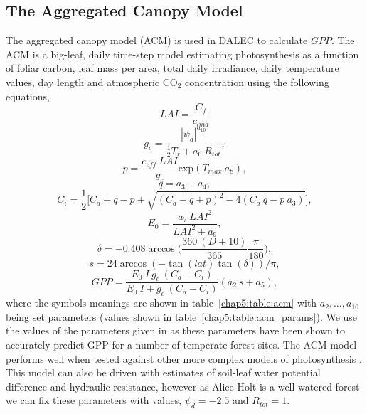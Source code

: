 \subsection{The Aggregated Canopy Model} \label{chap5:sec:ACM}
The aggregated canopy model (ACM) is used in DALEC to calculate $GPP$. The ACM is a big-leaf, daily time-step model estimating photosynthesis as a function of foliar carbon, leaf mass per area, total daily irradiance, daily temperature values, day length and atmospheric CO\(_{2}\) concentration using the following equations,
\begin{equation}
LAI = \frac{C_f}{c_{lma}} 
\end{equation}
\begin{equation} 
g_c = \frac{|\psi_d|^{a_{10}}}{\frac{1}{2}T_r + a_6~R_{tot}},
\end{equation}
\begin{equation}
p = \frac{c_{eff}~LAI}{g_c}\text{exp}(T_{max}~a_8),
\end{equation}
\begin{equation}
q = a_3 - a_4,
\end{equation}
\begin{equation}
C_i = \frac{1}{2}\bigg[C_a + q - p + \sqrt{(C_a + q + p)^{2} - 4(C_a~q - p~a_3)} \bigg],
\end{equation}
\begin{equation}
E_0 = \frac{a_7~LAI^2}{LAI^2 + a_9},
\end{equation}
\begin{equation}
\delta = -0.408\arccos\bigg(\frac{360~(D+10)}{365}\frac{\pi}{180}\bigg),
\end{equation}
\begin{equation}
s = 24\arccos(-\tan(lat)\tan(\delta))/\pi,
\end{equation}
\begin{equation}
GPP = \frac{E_0~I~g_c~(C_a-C_i)}{E_0~I + g_c~(C_a-C_i)}(a_2~s + a_5),
\end{equation}
where the symbols meanings are shown in table~\ref{chap5:table:acm} with $a_2,\dots ,a_{10}$ being set parameters (values shown in table~\ref{chap5:table:acm_params}). We use the values of the parameters given in \citet{fox2009reflex} as these parameters have been shown to accurately predict GPP for a number of temperate forest sites. The ACM model performs well when tested against other more complex models of photosynthesis \citep{williams1997predicting}. This model can also be driven with estimates of soil-leaf water potential difference and hydraulic resistance, however as Alice Holt is a well watered forest we can fix these parameters with values, \(\psi_d = -2.5\) and \(R_{tot} = 1\).
